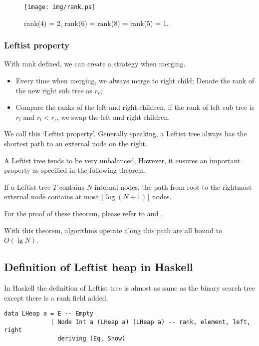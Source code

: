 \documentclass{article}
\begin{document}
\begin{figure}[htbp]
   \begin{center}
     \texttt{[image: img/rank.ps]}
     \caption{rank(4) = 2, rank(6) = rank(8) = rank(5) = 1.} \label{fig:rank}
   \end{center}
\end{figure}

\subsubsection{Leftist property}

With rank defined, we can create a strategy when merging.

\begin{itemize}
\item Every time when merging, we always merge to right child; Denote the rank
of the new right sub tree as $r_r$;
\item Compare the ranks of the left and right children, if the rank of
left sub tree is $r_l$ and $r_l < r_r$, we swap the left and right children.
\end{itemize}

We call this `Leftist property'. Generally speaking, a Leftist tree always
has the shortest path to an external node on the right.

A Leftist tree tends to be very unbalanced, However, it ensures an important
property as specified in the following theorem.

If a Leftist tree $T$ contains $N$ internal nodes, the path from root to the
rightmost external node contains at most $\lfloor \log{(N+1)} \rfloor$ nodes.

For the proof of these theorem, please refer to \cite{brono-book} and \cite{TAOCP}.

With this theorem, algorithms operate along this path are all bound to $O(\lg N)$.

\subsection*{Definition of Leftist heap in Haskell}

In Haskell the definition of Leftist tree is almost as same as the
binary search tree except there is a rank field added.

\lstset{language=Haskell}
\begin{lstlisting}
data LHeap a = E -- Empty
             | Node Int a (LHeap a) (LHeap a) -- rank, element, left, right
               deriving (Eq, Show)
\end{lstlisting}
\end{document}
